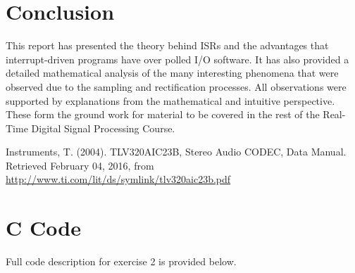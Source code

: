 \documentclass{article}
\begin{document}
\newpage
\section{Conclusion}
This report has presented the theory behind ISRs and the advantages that interrupt-driven programs have over polled I/O software. It has also provided a detailed mathematical analysis of the many interesting phenomena that were observed due to the sampling and rectification processes. All observations were supported by explanations from the mathematical and intuitive perspective. These form the ground work for material to be covered in the rest of the Real-Time Digital Signal Processing Course. 

\newpage
\begin{thebibliography}{99}
 Instruments, T. (2004). TLV320AIC23B, Stereo Audio CODEC, Data Manual. Retrieved February 04, 2016, from \url{http://www.ti.com/lit/ds/symlink/tlv320aic23b.pdf}
\end{thebibliography}

\newpage
\appendix{}
\section{C Code}

Full code description for exercise 2 is provided below.\\
\end{document}
